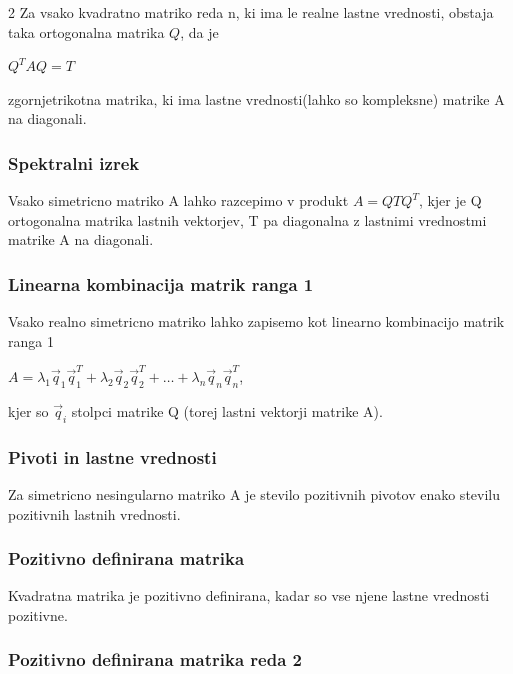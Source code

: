 \documentclass{article}
\begin{document}
\begin{multicols}{2}
	Za vsako kvadratno matriko reda n, ki ima le realne lastne vrednosti,
	obstaja taka ortogonalna matrika $Q$, da je
	\begin{center}
		\begin{math}
			Q^{T}AQ = T
		\end{math}
	\end{center}
	zgornjetrikotna matrika, ki ima lastne vrednosti(lahko so kompleksne) matrike A na diagonali.

	\subsubsection{Spektralni izrek}

	Vsako simetricno matriko A lahko razcepimo v produkt
	$A = QTQ^{T}$, kjer je Q ortogonalna matrika lastnih vektorjev, T pa diagonalna z lastnimi
	vrednostmi matrike A na diagonali.

	\subsubsection{Linearna kombinacija matrik ranga 1}

	Vsako realno simetricno matriko lahko zapisemo kot linearno kombinacijo matrik ranga 1
	\begin{center}
		\begin{math}
			A = \lambda_{1}\vec{q}_{1}\vec{q}_{1}^{T} + \lambda_{2}\vec{q}_{2}\vec{q}_{2}^{T} +
			\dots + \lambda_{n}\vec{q}_{n}\vec{q}_{n}^{T}
		\end{math},
	\end{center}
	kjer so $\vec{q}_{i}$ stolpci matrike Q (torej lastni vektorji matrike A).

	\subsubsection{Pivoti in lastne vrednosti}

	Za simetricno nesingularno matriko A je stevilo pozitivnih pivotov enako
	stevilu pozitivnih lastnih vrednosti.

	\subsubsection{Pozitivno definirana matrika}

	Kvadratna matrika je pozitivno definirana, kadar so vse njene lastne vrednosti pozitivne.

	\subsubsection{Pozitivno definirana matrika reda 2}


\end{multicols}
\end{document}
